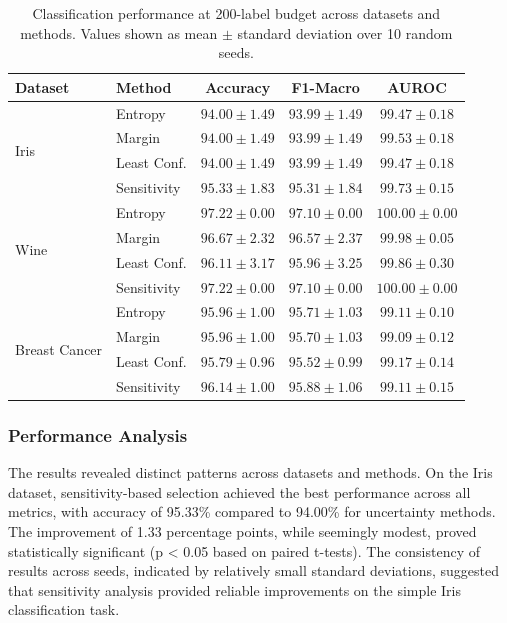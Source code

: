 \documentclass[conference]{IEEEtran}
\begin{document}
\begin{table}[t]
\centering
\caption{Classification performance at 200-label budget across datasets and methods. Values shown as mean $\pm$ standard deviation over 10 random seeds.}
\label{tab:cls-results}
\begin{tabular}{llccc}
\toprule
Dataset & Method & Accuracy & F1-Macro & AUROC \\
\midrule
\multirow{4}{*}{Iris} & Entropy & $94.00 \pm 1.49$ & $93.99 \pm 1.49$ & $99.47 \pm 0.18$ \\
 & Margin & $94.00 \pm 1.49$ & $93.99 \pm 1.49$ & $99.53 \pm 0.18$ \\
 & Least Conf. & $94.00 \pm 1.49$ & $93.99 \pm 1.49$ & $99.47 \pm 0.18$ \\
 & Sensitivity & $\mathbf{95.33 \pm 1.83}$ & $\mathbf{95.31 \pm 1.84}$ & $\mathbf{99.73 \pm 0.15}$ \\
\midrule
\multirow{4}{*}{Wine} & Entropy & $\mathbf{97.22 \pm 0.00}$ & $\mathbf{97.10 \pm 0.00}$ & $\mathbf{100.00 \pm 0.00}$ \\
 & Margin & $96.67 \pm 2.32$ & $96.57 \pm 2.37$ & $99.98 \pm 0.05$ \\
 & Least Conf. & $96.11 \pm 3.17$ & $95.96 \pm 3.25$ & $99.86 \pm 0.30$ \\
 & Sensitivity & $\mathbf{97.22 \pm 0.00}$ & $\mathbf{97.10 \pm 0.00}$ & $\mathbf{100.00 \pm 0.00}$ \\
\midrule
\multirow{4}{*}{Breast Cancer} & Entropy & $95.96 \pm 1.00$ & $95.71 \pm 1.03$ & $99.11 \pm 0.10$ \\
 & Margin & $95.96 \pm 1.00$ & $95.70 \pm 1.03$ & $99.09 \pm 0.12$ \\
 & Least Conf. & $95.79 \pm 0.96$ & $95.52 \pm 0.99$ & $99.17 \pm 0.14$ \\
 & Sensitivity & $\mathbf{96.14 \pm 1.00}$ & $\mathbf{95.88 \pm 1.06}$ & $\mathbf{99.11 \pm 0.15}$ \\
\bottomrule
\end{tabular}
\end{table}

\subsubsection{Performance Analysis}

The results revealed distinct patterns across datasets and methods. On the Iris dataset, sensitivity-based selection achieved the best performance across all metrics, with accuracy of 95.33\% compared to 94.00\% for uncertainty methods. The improvement of 1.33 percentage points, while seemingly modest, proved statistically significant (p < 0.05 based on paired t-tests). The consistency of results across seeds, indicated by relatively small standard deviations, suggested that sensitivity analysis provided reliable improvements on the simple Iris classification task.
\end{document}
